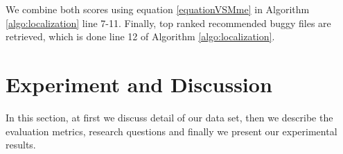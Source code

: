 \documentclass[conference]{IEEEtran}
\begin{document}
We combine both scores using equation \ref{equationVSMme} in Algorithm \ref{algo:localization} line 7-11. Finally, top ranked recommended buggy files are retrieved, which is done line 12 of Algorithm \ref{algo:localization}.





\section{Experiment and Discussion} \label{sec:expANDdiss}
In this section, at first we discuss detail of our data set, then we describe the evaluation metrics, research questions and finally we present our experimental results.




\end{document}
